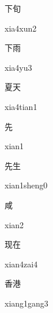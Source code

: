 \begin{verbete}{下旬}
\begin{pronuncia}{xia4xun2}
\end{pronuncia}
\end{verbete}

\begin{verbete}[xia4yu3]{下雨}
\begin{pronuncia}{xia4yu3}
\end{pronuncia}
\end{verbete}

\begin{verbete}{夏天}
\begin{pronuncia}{xia4tian1}
\end{pronuncia}
\end{verbete}

\begin{verbete}[xian1]{先}
\begin{pronuncia}{xian1}
\end{pronuncia}
\end{verbete}

\begin{verbete}{先生}
\begin{pronuncia}{xian1sheng0}
\end{pronuncia}
\end{verbete}

\begin{verbete}[xian2]{咸}
\begin{pronuncia}{xian2}
\end{pronuncia}
\end{verbete}

\begin{verbete}{现在}
\begin{pronuncia}{xian4zai4}
\end{pronuncia}
\end{verbete}

\begin{verbete}{香港}
\begin{pronuncia}{xiang1gang3}
\end{pronuncia}
\end{verbete}

